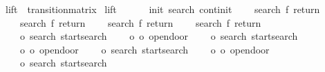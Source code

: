 \begin{isabellebody}
\isanewline
{}\isamarkupfalse%
\ {\isachardoublequoteopen}lift{\isachardoublequoteclose}\ {\isacharcolon}{\isacharcolon}\ {\isachardoublequoteopen}transition{\isacharunderscore}matrix{\isachardoublequoteclose}\ \isanewline
{\isachardoublequoteopen}lift\ {\isasymequiv}\ {\isacharbraceleft}{\isacharbar}\isanewline
\ \ \ \ {\isacharparenleft}{\isacharparenleft}init{\isacharcomma}\ search{\isacharparenright}{\isacharcomma}\ continit{\isacharparenright}{\isacharcomma}\isanewline
\isanewline
\ \ \ \ {\isacharparenleft}{\isacharparenleft}search{\isacharcomma}\ f{}{\isacharparenright}{\isacharcomma}\ return{}{\isacharparenright}{\isacharcomma}\isanewline
\ \ \ \ {\isacharparenleft}{\isacharparenleft}search{\isacharcomma}\ f{}{\isacharparenright}{\isacharcomma}\ return{}{\isacharparenright}{\isacharcomma}\isanewline
\ \ \ \ {\isacharparenleft}{\isacharparenleft}search{\isacharcomma}\ f{}{\isacharparenright}{\isacharcomma}\ return{}{\isacharparenright}{\isacharcomma}\isanewline
\ \ \ \ {\isacharparenleft}{\isacharparenleft}search{\isacharcomma}\ f{}{\isacharparenright}{\isacharcomma}\ return{}{\isacharparenright}{\isacharcomma}\isanewline
\isanewline
\ \ \ \ {\isacharparenleft}{\isacharparenleft}o{}{\isacharcomma}\ search{\isacharparenright}{\isacharcomma}\ startsearch{\isacharparenright}{\isacharcomma}\isanewline
\ \ \ \ {\isacharparenleft}{\isacharparenleft}o{}{\isacharcomma}\ o{}{\isacharparenright}{\isacharcomma}\ opendoor{}{\isacharparenright}{\isacharcomma}\isanewline
\isanewline
\ \ \ \ {\isacharparenleft}{\isacharparenleft}o{}{\isacharcomma}\ search{\isacharparenright}{\isacharcomma}\ startsearch{\isacharparenright}{\isacharcomma}\isanewline
\ \ \ \ {\isacharparenleft}{\isacharparenleft}o{}{\isacharcomma}\ o{}{\isacharparenright}{\isacharcomma}\ opendoor{}{\isacharparenright}{\isacharcomma}\isanewline
\isanewline
\ \ \ \ {\isacharparenleft}{\isacharparenleft}o{}{\isacharcomma}\ search{\isacharparenright}{\isacharcomma}\ startsearch{\isacharparenright}{\isacharcomma}\isanewline
\ \ \ \ {\isacharparenleft}{\isacharparenleft}o{}{\isacharcomma}\ o{}{\isacharparenright}{\isacharcomma}\ opendoor{}{\isacharparenright}{\isacharcomma}\isanewline
\isanewline
\ \ \ \ {\isacharparenleft}{\isacharparenleft}o{}{\isacharcomma}\ search{\isacharparenright}{\isacharcomma}\ startsearch{\isacharparenright}{\isacharcomma}\isanewline

\end{isabellebody}
